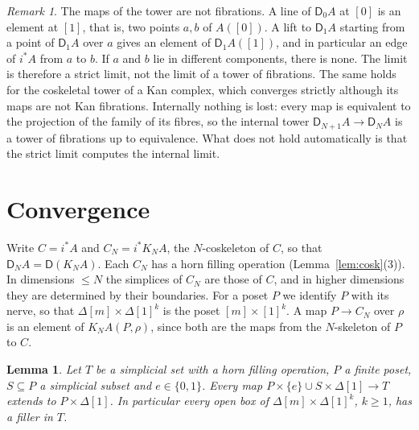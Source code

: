 \documentclass[11pt]{article}
\newcommand{\D}{\mathsf{D}}
\theoremstyle{plain}
\newtheorem{lemma}[theorem]{Lemma}
\theoremstyle{definition}
\theoremstyle{remark}
\newtheorem{remark}[theorem]{Remark}
\begin{document}
\begin{remark}\label{rem:notfib}
The maps of the tower are not fibrations. A line of $\D_0A$ at $[0]$ is an
element at $[1]$, that is, two points $a,b$ of $A([0])$. A lift to $\D_1A$
starting from a point of $\D_1A$ over $a$ gives an element of $\D_1A([1])$,
and in particular an edge of $i^*A$ from $a$ to $b$. If $a$ and $b$ lie in
different components, there is none. The limit is therefore a strict
limit, not the limit of a tower of fibrations. The same holds for the
coskeletal tower of a Kan complex, which converges strictly although its
maps are not Kan fibrations. Internally nothing is lost: every map is
equivalent to the projection of the family of its fibres, so the internal
tower $\D_{N+1}A\to\D_NA$ is a tower of fibrations up to equivalence. What
does not hold automatically is that the strict limit computes the internal limit.
\end{remark}

\section{Convergence}\label{sec:conv}

Write $C=i^*A$ and $C_N=i^*K_NA$, the $N$-coskeleton of $C$, so that
$\D_NA=\D(K_NA)$. Each $C_N$ has a horn filling operation
(Lemma~\ref{lem:cosk}(3)).
In dimensions $\le N$ the simplices of $C_N$ are those of $C$, and in higher
dimensions they are determined by their boundaries. For a poset $P$ we
identify $P$ with its nerve, so that $\Delta[m]\times\Delta[1]^k$ is the
poset $[m]\times[1]^k$. A map $P\to C_N$ over $\rho$ is an element of
$K_NA(P,\rho)$, since both are the maps from the $N$-skeleton of $P$ to $C$.

\begin{lemma}\label{lem:box}
Let $T$ be a simplicial set with a horn filling operation, $P$ a finite
poset, $S\subseteq P$ a simplicial subset and $e\in\{0,1\}$. Every map
$P\times\{e\}\cup S\times\Delta[1]\to T$ extends to $P\times\Delta[1]$.
In particular every open box of $\Delta[m]\times\Delta[1]^k$, $k\ge1$, has a
filler in $T$.
\end{lemma}
\end{document}
